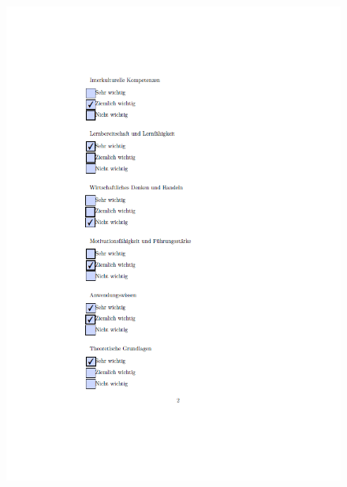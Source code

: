 \begin{figure}[ht]
	\centering
 	\includegraphics[width=1.3\textwidth]{images/Tiwe2.png}
 	\label{fig:fragtiw2}
\end{figure}

